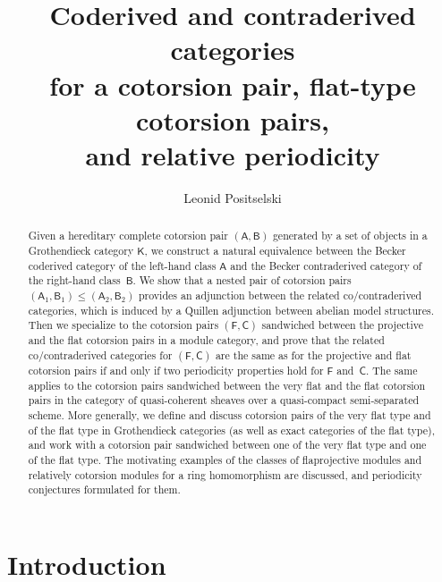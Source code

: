 \documentclass[12pt,a4paper]{amsart}
\newcommand{\+}{\nobreakdash-}
\renewcommand{\:}{\colon}
\newcommand{\sA}{\mathsf A}
\newcommand{\sB}{\mathsf B}
\newcommand{\sC}{\mathsf C}
\newcommand{\sF}{\mathsf F}
\newcommand{\sK}{\mathsf K}
\theoremstyle{plain}
\theoremstyle{definition}
\begin{document}
\title{Coderived and contraderived categories \\
for a cotorsion pair, flat-type cotorsion pairs, \\
and relative periodicity}

\author{Leonid Positselski}

\address{Institute of Mathematics, Czech Academy of Sciences \\
\v Zitn\'a~25, 115~67 Prague~1 \\ Czech Republic} 


\begin{abstract}
 Given a hereditary complete cotorsion pair $(\sA,\sB)$ generated by
a set of objects in a Grothendieck category $\sK$, we construct
a natural equivalence between the Becker coderived category of
the left-hand class $\sA$ and the Becker contraderived category of
the right-hand class~$\sB$.
 We show that a nested pair of cotorsion pairs $(\sA_1,\sB_1)\le
(\sA_2,\sB_2)$ provides an adjunction between the related
co/contraderived categories, which is induced by a Quillen adjunction
between abelian model structures.
 Then we specialize to the cotorsion pairs $(\sF,\sC)$ sandwiched
between the projective and the flat cotorsion pairs in a module
category, and prove that the related co/contraderived categories for
$(\sF,\sC)$ are the same as for the projective and flat cotorsion pairs
if and only if two periodicity properties hold for $\sF$ and~$\sC$.
 The same applies to the cotorsion pairs sandwiched between the very
flat and the flat cotorsion pairs in the category of quasi-coherent
sheaves over a quasi-compact semi-separated scheme.
 More generally, we define and discuss cotorsion pairs of the very flat
type and of the flat type in Grothendieck categories (as well as exact
categories of the flat type), and work with a cotorsion pair sandwiched
between one of the very flat type and one of the flat type.
 The motivating examples of the classes of flaprojective modules and
relatively cotorsion modules for a ring homomorphism are discussed,
and periodicity conjectures formulated for them.
\end{abstract}

\maketitle

\tableofcontents

\section*{Introduction}
\medskip
\end{document}
